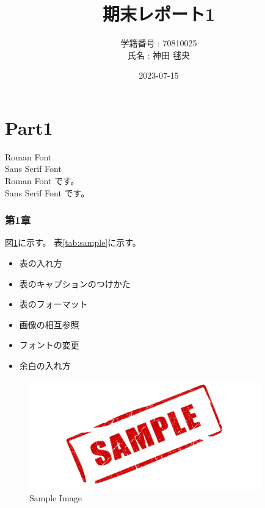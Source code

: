 \documentclass{jsarticle}
\title{期末レポート1}
\author{学籍番号 : 70810025 \\ 氏名 : 神田 毬央}
\date{2023-07-15}
\begin{document}
    \maketitle

    \part{Part1}

    {\rmfamily Roman Font} \\
    {\sffamily Sans Serif Font} \\

    {\rmfamily Roman Font です。} \\
    {\sffamily Sans Serif Font です。} \\

    \tableofcontents


    \section{第1章}

    図\ref{fig:sample}に示す。
    表\ref{tab:sample}に示す。
    

    \begin{itemize}
        \item 表の入れ方
        \item 表のキャプションのつけかた
        \item 表のフォーマット
        \item 画像の相互参照
        \item フォントの変更
        \item 余白の入れ方
    \end{itemize}

    

    \begin{table}[htbp]
        \centering
        \caption{Sample Table}
        \label{tab:sample}
        \begin{tabular}
            
        \end{tabular}
    \end{table}

    \begin{figure}[htbp]
        \centering
        \includegraphics[width=10cm]{sample.png}
        \caption{Sample Image}
        \label{fig:sample}
    \end{figure}
\end{document}
